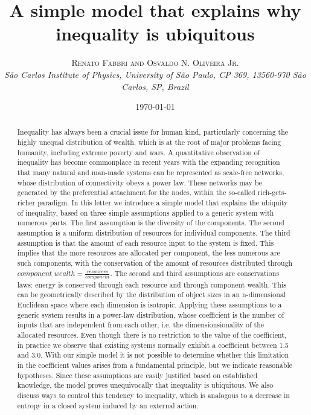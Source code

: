 \documentclass[a4paper, 11pt]{article} %
\title{\textbf{A simple model that explains why inequality is ubiquitous}\\ %
} %
\author{\textsc{Renato Fabbri and Osvaldo N. Oliveira Jr.} %
\\{\textit{São Carlos Institute of Physics, University of São Paulo, CP 369, 13560-970 São Carlos, SP, Brazil}}} %
\date{\today} %
\makeatletter
\renewcommand{\maketitle}{ %
\begin{flushright} %
{\LARGE\@title} %

\vspace{5pt} %

{\large\@author} %
\\\@date %

\vspace{1pt} %
\end{flushright}
}
\makeatother
\begin{document}
\maketitle %



%
\begin{abstract}
	Inequality has always been a crucial issue for human kind, particularly concerning the highly unequal distribution of wealth, which is at the root of major problems facing humanity, including extreme poverty and wars.
	A quantitative observation of inequality has become commonplace in recent years
	with the expanding recognition that many natural and man-made systems can be represented as scale-free networks,
	whose distribution of connectivity obeys a power law.
	These networks may be generated by the preferential attachment for the nodes, within the so-called rich-gets-richer paradigm.
	In this letter we introduce a simple model that explains the ubiquity of inequality, based on three simple assumptions applied to a generic system with numerous parts.
	The first assumption is the diversity of the components.
	The second assumption is a uniform distribution of resources for individual components.
	The third assumption is that the amount of each resource input to the system is fixed.
	This implies that the more resources are allocated per component, the less numerous are such components,
	with the conservation of the amount of resources distributed through $component\; wealth = \frac{resources}{component}$.
	The second and third assumptions are conservations laws: energy is conserved through each resource and through component wealth.
	This can be geometrically described by the distribution of object sizes in an n-dimensional Euclidean space where each dimension is isotropic.
	Applying these assumptions to a generic system results in a power-law distribution, whose coefficient is the number of inputs that are independent from each other, i.e. the dimensionsionality of the allocated resources.
	Even though there is no restriction to the value of the coefficient,
	in practice we observe that existing systems normally exhibit a coefficient between 1.5 and 3.0.
	With our simple model it is not possible to determine whether this limitation in the coefficient values arises from a fundamental principle, but we indicate reasonable hypotheses.
	Since these assumptions are easily justified based on established knowledge,
	the model proves unequivocally that inequality is ubiquitous.
	We also discuss ways to control this tendency to inequality,
	which is analogous to a decrease in entropy in a closed system induced by an external action.
\end{abstract}
\end{document}
